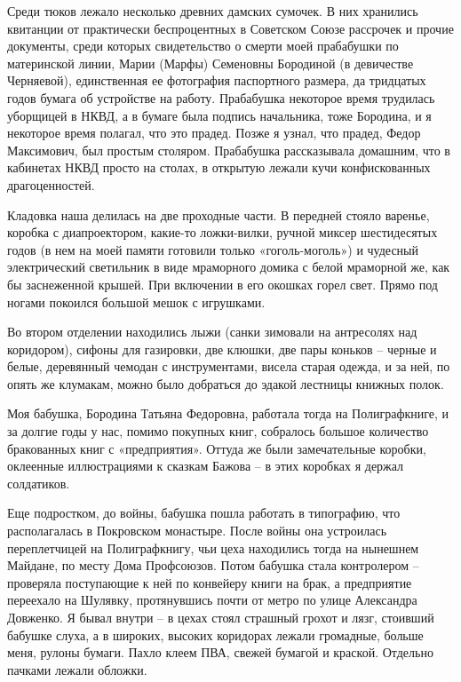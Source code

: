Среди тюков лежало несколько древних дамских сумочек. В них хранились квитанции от практически беспроцентных в Советском Союзе рассрочек и прочие документы, среди которых свидетельство о смерти моей прабабушки по материнской линии, Марии (Марфы) Семеновны Бородиной (в девичестве Черняевой), единственная ее фотография паспортного размера, да тридцатых годов бумага об устройстве на работу. Прабабушка некоторое время трудилась уборщицей в НКВД, а в бумаге была подпись начальника, тоже Бородина, и я некоторое время полагал, что это прадед. Позже я узнал, что прадед, Федор Максимович, был простым столяром. Прабабушка рассказывала домашним, что в кабинетах НКВД просто на столах, в открытую лежали кучи конфискованных драгоценностей.

Кладовка наша делилась на две проходные части. В передней стояло варенье, коробка с диапроектором, какие-то ложки-вилки, ручной миксер шестидесятых годов (в нем на моей памяти готовили только «гоголь-моголь») и чудесный электрический светильник в виде мраморного домика с белой мраморной же, как бы заснеженной крышей. При включении в его окошках горел свет. Прямо под ногами покоился большой мешок с игрушками.

Во втором отделении находились лыжи (санки зимовали на антресолях над коридором), сифоны для газировки, две клюшки, две пары коньков – черные и белые, деревянный чемодан с инструментами, висела старая одежда, и за ней, по опять же клумакам, можно было добраться до эдакой лестницы книжных полок.

Моя бабушка, Бородина Татьяна Федоровна, работала тогда на Полиграфкниге, и за долгие годы у нас, помимо покупных книг, собралось большое количество бракованных книг с «предприятия». Оттуда же были замечательные коробки, оклеенные иллюстрациями к сказкам Бажова – в этих коробках я держал солдатиков.

Еще подростком, до войны, бабушка пошла работать в типографию, что располагалась в Покровском монастыре. После войны она устроилась переплетчицей на Полиграфкнигу, чьи цеха находились тогда на нынешнем Майдане, по месту Дома Профсоюзов. Потом бабушка стала контролером – проверяла поступающие к ней по конвейеру книги на брак, а предприятие переехало на Шулявку, протянувшись почти от метро по улице Александра Довженко. Я бывал внутри – в цехах стоял страшный грохот и лязг, стоивший бабушке слуха, а в широких, высоких коридорах лежали громадные, больше меня, рулоны бумаги. Пахло клеем ПВА, свежей бумагой и краской. Отдельно пачками лежали обложки.

